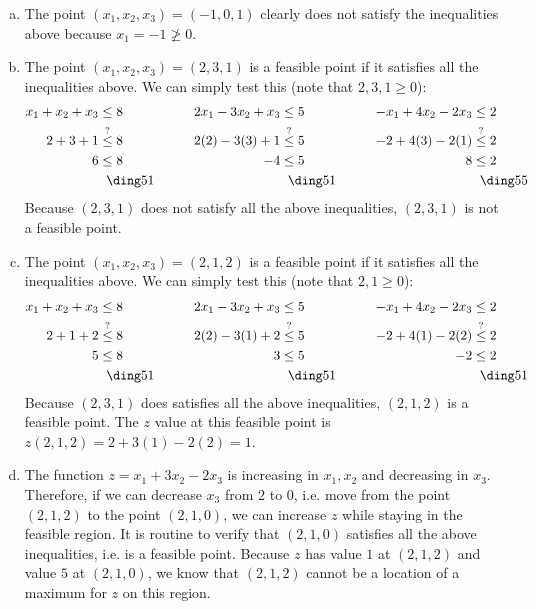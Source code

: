 \documentclass[11pt,letterpaper]{article}
\begin{document}
\sol
\begin{enumerate}[(a)]
\item The point $(x_1, x_2, x_3)= (-1, 0, 1)$ clearly does not satisfy the inequalities above because $x_1= -1 \not\geq 0$. 

\item The point $(x_1, x_2, x_3)= (2, 3, 1)$ is a feasible point if it satisfies all the inequalities above. We can simply test this (note that $2, 3, 1 \geq 0$): 
	\[
	\begin{aligned}
	x_1 + x_2 + x_3&\leq 8 &\qquad 2x_1 - 3x_2 + x_3&\leq 5 &\qquad -x_1 + 4x_2 - 2x_3&\leq 2 \\
	2 + 3 + 1&\stackrel{?}{\leq} 8 & 2(2) - 3(3) + 1&\stackrel{?}{\leq} 5 & -2 + 4(3) - 2(1)&\stackrel{?}{\leq} 2 \\
	6&\leq 8 & -4&\leq 5 & 8&\leq 2 \\
	\phantom{x}&\phantom{x}\text{\cmark} & \phantom{x}&\phantom{x}\text{\cmark} & \phantom{x}&\phantom{x}\text{\xmark}
	\end{aligned}
	\]
Because $(2, 3, 1)$ does not satisfy all the above inequalities, $(2, 3, 1)$ is not a feasible point. 

\item The point $(x_1, x_2, x_3)= (2, 1, 2)$ is a feasible point if it satisfies all the inequalities above. We can simply test this (note that $2, 1 \geq 0$): 
	\[
	\begin{aligned}
	x_1 + x_2 + x_3&\leq 8 &\qquad 2x_1 - 3x_2 + x_3&\leq 5 &\qquad -x_1 + 4x_2 - 2x_3&\leq 2 \\
	2 + 1 + 2&\stackrel{?}{\leq} 8 & 2(2) - 3(1) + 2&\stackrel{?}{\leq} 5 & -2 + 4(1) - 2(2)&\stackrel{?}{\leq} 2 \\
	5&\leq 8 & 3&\leq 5 & -2&\leq 2 \\
	\phantom{x}&\phantom{x}\text{\cmark} & \phantom{x}&\phantom{x}\text{\cmark} & \phantom{x}&\phantom{x}\text{\cmark}
	\end{aligned}
	\]
Because $(2, 3, 1)$ does satisfies all the above inequalities, $(2, 1, 2)$ is a feasible point. The $z$ value at this feasible point is $z(2, 1, 2)= 2 + 3(1) - 2(2)= 1$. 
 
\item The function $z= x_1 + 3x_2 - 2x_3$ is increasing in $x_1, x_2$ and decreasing in $x_3$. Therefore, if we can decrease $x_3$ from $2$ to $0$, i.e. move from the point $(2, 1, 2)$ to the point $(2, 1, 0)$, we can increase $z$ while staying in the feasible region. It is routine to verify that $(2, 1, 0)$ satisfies all the above inequalities, i.e. is a feasible point. Because $z$ has value $1$ at $(2, 1, 2)$ and value $5$ at $(2, 1, 0)$, we know that $(2, 1, 2)$ cannot be a location of a maximum for $z$ on this region. 
\end{enumerate}
\end{document}
